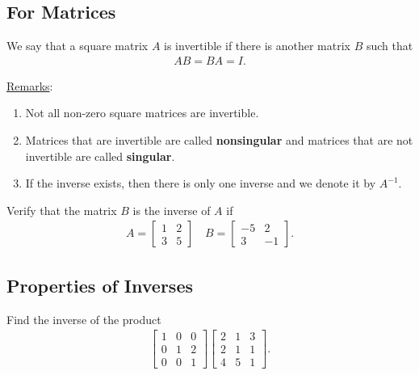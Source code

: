 \documentclass[12pt,a4paper]{article}
\newcounter{example}[section]
\begin{document}
\subsection{For Matrices}
We say that a square matrix $A$ is invertible if there is another matrix $B$ such that
	\begin{align*}
	A B = BA = I .
	\end{align*}
	
\noindent\underline{Remarks}:
		\begin{enumerate}[\textbullet]
		\item Not all non-zero square matrices are invertible.
		\item Matrices that are invertible are called \textbf{nonsingular} and matrices that are not invertible are called \textbf{singular}.
		\item If the inverse exists, then there is only one inverse and we denote it by $A^{-1}$.
		\end{enumerate}
	
\begin{example}
Verify that the matrix $B$ is the inverse of $A$ if
	\begin{align*}
	A = \begin{bmatrix}
	1 & 2 \\ 3 & 5
	\end{bmatrix}
	\quad
	B = \begin{bmatrix}
	-5 & 2 \\ 3 & -1
	\end{bmatrix} .
	\end{align*}
\end{example}

\newpage

\subsection{Properties of Inverses}

\begin{example}
Find the inverse of the product
	\begin{align*}
	\begin{bmatrix}
	1 & 0 & 0 \\ 0 & 1 & 2 \\ 0 & 0 & 1
	\end{bmatrix} 
	\begin{bmatrix}
	2 & 1 & 3 \\ 2 & 1 & 1 \\ 4 & 5 & 1
	\end{bmatrix} .
	\end{align*}
\end{example}
\end{document}

